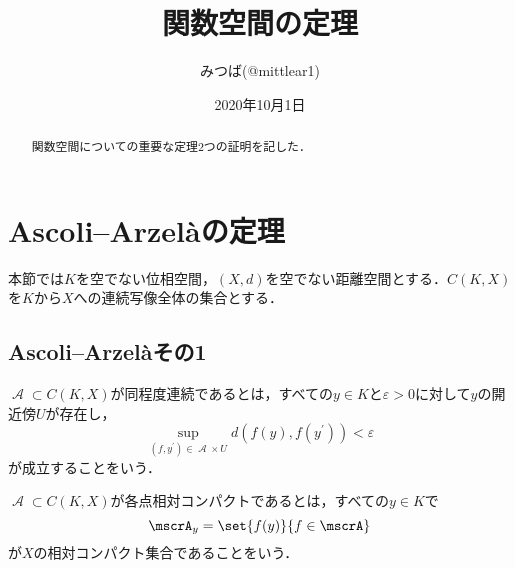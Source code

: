 \documentclass[uplatex]{jsarticle}
\title{関数空間の定理}
\author{みつば(@mittlear1)}
\date{2020年10月1日}
\begin{document}
\maketitle
\begin{abstract}
  \begin{center}
		関数空間についての重要な定理2つの証明を記した．
	\end{center}
\end{abstract}

\section{Ascoli--Arzel\`{a}の定理}
本節では$K$を空でない位相空間，$(X,d)$を空でない距離空間とする．$C(K,X)$を$K$から$X$への連続写像全体の集合とする．
\subsection{Ascoli--Arzel\`{a}その1}
\begin{definition}
$\mscrA\subset C(K,X)$が同程度連続であるとは，すべての$y\in K$と$\varepsilon > 0$に対して$y$の開近傍$U$が存在し，
\[ \sup_{(f,y^\prime)\in \mscrA\times U} d(f(y),f(y^\prime)) < \varepsilon \]
が成立することをいう．
\end{definition}

\begin{definition}
$\mscrA\subset C(K,X)$が各点相対コンパクトであるとは，すべての$y\in K$で
\[ \mscrA_y = \set{f(y)}{f\in \mscrA} \]
が$X$の相対コンパクト集合であることをいう．
\end{definition}
\end{document}
